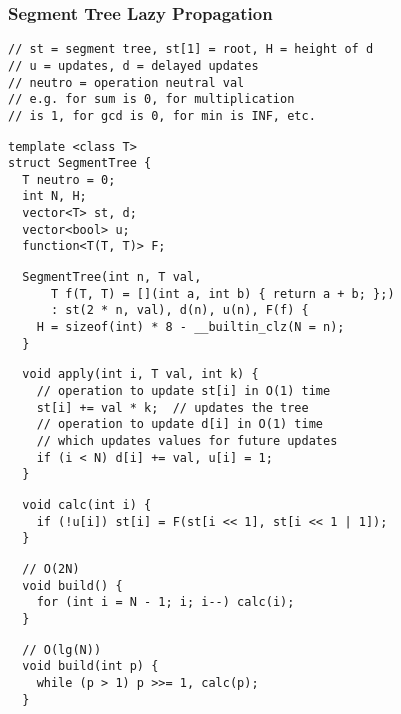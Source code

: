 \documentclass[twoside]{article}
\begin{document}
\begin{multicols*}{2}
\subsubsection*{Segment Tree Lazy Propagation}
\begin{verbatim}
// st = segment tree, st[1] = root, H = height of d
// u = updates, d = delayed updates
// neutro = operation neutral val
// e.g. for sum is 0, for multiplication
// is 1, for gcd is 0, for min is INF, etc.
\end{verbatim}
\vspace{-12pt}
\begin{verbatim}
template <class T>
struct SegmentTree {
  T neutro = 0;
  int N, H;
  vector<T> st, d;
  vector<bool> u;
  function<T(T, T)> F;
\end{verbatim}
\vspace{-12pt}
\begin{verbatim}
  SegmentTree(int n, T val,
      T f(T, T) = [](int a, int b) { return a + b; };)
      : st(2 * n, val), d(n), u(n), F(f) {
    H = sizeof(int) * 8 - __builtin_clz(N = n);
  }
  \end{verbatim}
\vspace{-12pt}
\begin{verbatim}
  void apply(int i, T val, int k) {
    // operation to update st[i] in O(1) time
    st[i] += val * k;  // updates the tree
    // operation to update d[i] in O(1) time
    // which updates values for future updates
    if (i < N) d[i] += val, u[i] = 1;
  }
\end{verbatim}
\vspace{-12pt}
\begin{verbatim}
  void calc(int i) {
    if (!u[i]) st[i] = F(st[i << 1], st[i << 1 | 1]);
  }
\end{verbatim}
\vspace{-12pt}
\begin{verbatim}
  // O(2N)
  void build() {
    for (int i = N - 1; i; i--) calc(i);
  }
\end{verbatim}
\vspace{-12pt}
\begin{verbatim}
  // O(lg(N))
  void build(int p) {
    while (p > 1) p >>= 1, calc(p);
  }
\end{verbatim}
\vspace{-12pt}

\end{multicols*}
\end{document}
